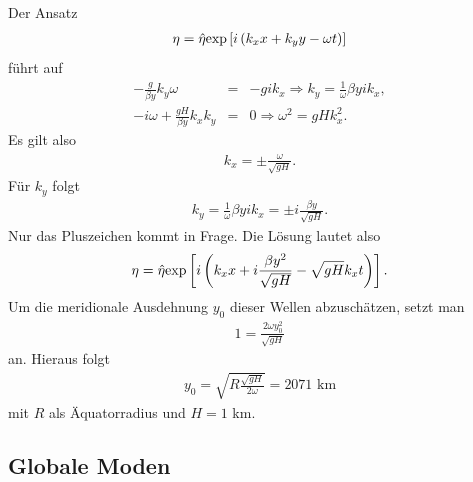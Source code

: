 \documentclass{book}
\newcommand\shifthat[2]{\stackengine{\Sstackgap}{$#2$}{\(\hspace{#1}\hat{}\)}{O}{l}{F}{T}{S}}
\newcommand\newhat[1]{%
\if A#1\shifthat{5.2 pt}{#1}\else
\if B#1\shifthat{4.7 pt}{#1}\else
\if H#1\shifthat{5.4 pt}{#1}\else
\if J#1\shifthat{5.0 pt}{#1}\else
\if N#1\shifthat{4.4 pt}{#1}\else
\if O#1\shifthat{4.5 pt}{#1}\else
\if P#1\shifthat{4.5 pt}{#1}\else
\if V#1\shifthat{4.5 pt}{#1}\else
\if W#1\shifthat{6.7 pt}{#1}\else
\if a#1\shifthat{3.0 pt}{#1}\else
\if r#1\shifthat{3.0 pt}{#1}\else
\if v#1\shifthat{3.0 pt}{#1}\else
\hat{#1}
\fi\fi\fi\fi\fi\fi\fi\fi\fi\fi\fi\fi}
\renewcommand{\exp}{\text{exp}}
\begin{document}
%
Der Ansatz
%
\begin{eqnarray}
\eta = \newhat{\eta}\exp\left[i\left(k_xx + k_yy -\omega t\right)\right]
\end{eqnarray}
%
führt auf
%
\begin{eqnarray}
-\frac{g}{\beta y}k_y\omega & = & -gik_x \Rightarrow k_y = \frac{1}{\omega}\beta yik_x,\\
-i\omega + \frac{gH}{\beta y}k_xk_y & = & 0 \Rightarrow \omega^2 = gHk_x^2.
\end{eqnarray}
%
Es gilt also
%
\begin{eqnarray}
k_x = \pm\frac{\omega}{\sqrt{gH}}.
\end{eqnarray}
%
Für $k_y$ folgt
%
\begin{eqnarray}
k_y = \frac{1}{\omega}\beta yik_x = \pm i\frac{\beta y}{\sqrt{gH}}.
\end{eqnarray}
%
Nur das Pluszeichen kommt in Frage. Die Lösung lautet also
%
\begin{eqnarray}
\eta = \newhat{\eta}\exp\left[i\left(k_xx + i\frac{\beta y^2}{\sqrt{gH}} - \sqrt{gH}k_xt\right)\right].
\end{eqnarray}
%
Um die meridionale Ausdehnung $y_0$ dieser Wellen abzuschätzen, setzt man
%
\begin{eqnarray}
1 = \frac{2\omega y_0^2}{\sqrt{gH}}
\end{eqnarray}
%
an. Hieraus folgt
%
\begin{eqnarray}
y_0 =\sqrt{R\frac{\sqrt{gH}}{2\omega}} = 2071\text{ km}
\end{eqnarray}
%
mit $R$ als Äquatorradius und $H = 1$ km.

\subsection{Globale Moden}
\label{sec:globale_moden}
\end{document}
